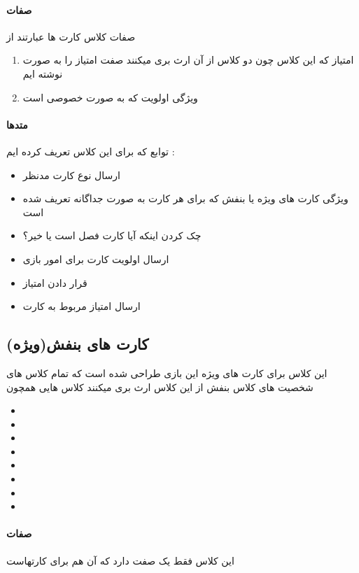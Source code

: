 \documentclass[pdf,titlepage,a4paper]{report}
\begin{document}
	\paragraph{صفات}
	صفات کلاس کارت ها  عبارتند از 
	\begin{enumerate}
		\item امتیاز که این کلاس چون دو کلاس از آن ارث بری میکنند صفت امتیاز را به صورت   نوشته ایم
		\item  ویژگی اولویت که به صورت خصوصی است
	\end{enumerate}

	\paragraph{متدها}
	توابع که برای این کلاس تعریف کرده ایم :

	\begin{itemize}
		\item {} ارسال نوع کارت مدنظر
		\item {} ویژگی کارت های ویژه یا بنفش که برای هر کارت به صورت جداگانه تعریف شده است
		\item {} چک کردن اینکه آیا کارت فصل است یا خیر؟
		\item {} ارسال اولویت کارت برای امور بازی 
		\item {}  قرار دادن امتیاز
		\item {} ارسال امتیاز مربوط به کارت
	\end{itemize}
	
	
	\subsection{کارت های بنفش(ویژه)}
	این کلاس برای کارت های ویژه این بازی طراحی شده است که تمام کلاس های شخصیت های کلاس بنفش از این کلاس ارث بری میکنند
	کلاس هایی همچون 
	\begin{itemize}
		\item {}
		\item {}
		\item {}
		\item {}
		\item {}
		\item {}
		\item {}
		\item {}  
	\end{itemize}
	\paragraph{صفات}
	این کلاس فقط یک صفت دارد که آن هم برای   کارتهاست
	\subparagraph{}
	
\end{document}
